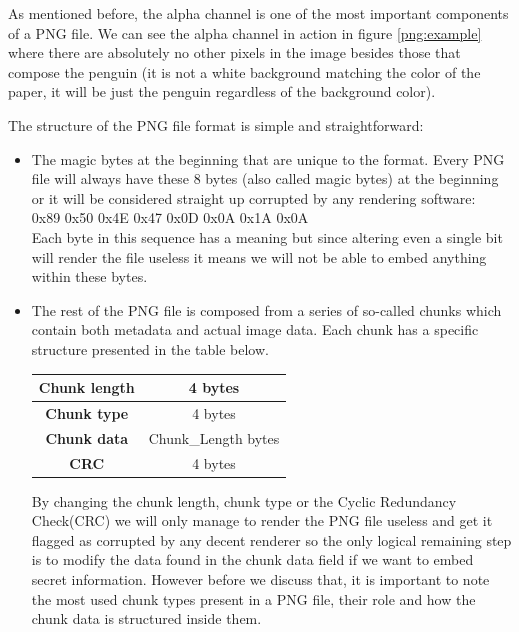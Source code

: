 \begin{multicols*}{2}
As mentioned before, the alpha channel is one of the most important components of a PNG file. We can see the alpha channel in action in figure \ref{png:example} where there are absolutely no other pixels in the image besides those that compose the penguin (it is not a white background matching the color of the paper, it will be just the penguin regardless of the background color). 

The structure of the PNG file format is simple and straightforward:
\begin{itemize}
  \item The magic bytes at the beginning that are unique to the format. Every PNG file will always have these 8 bytes (also called magic bytes) at the beginning or it will be considered straight up corrupted by any rendering software:
\\0x89 0x50 0x4E 0x47 0x0D 0x0A 0x1A 0x0A\\
Each byte in this sequence has a meaning but since altering even a single bit will render the file useless it means we will not be able to embed anything within these bytes.
  \item The rest of the PNG file is composed from a series of so-called chunks which contain both metadata and actual image data. Each chunk has a specific structure presented in the table below.
\begin{center}
\begin{tabular}{|c|c|}
\hline
\textbf{Chunk length} & 4 bytes \\ \hline
\textbf{Chunk type} & 4 bytes \\ \hline
\textbf{Chunk data} & Chunk\_Length bytes \\ \hline
\textbf{CRC} & 4 bytes \\ \hline
\end{tabular}
\label{png:chunk-structure}
\end{center}
By changing the chunk length, chunk type or the Cyclic Redundancy Check(CRC) we will only manage to render the PNG file useless and get it flagged as corrupted by any decent renderer so the only logical remaining step is to modify the data found in the chunk data field if we want to embed secret information. However before we discuss that, it is important to note the most used chunk types present in a PNG file, their role and how the chunk data is structured inside them.
\end{itemize}


\end{multicols*}
